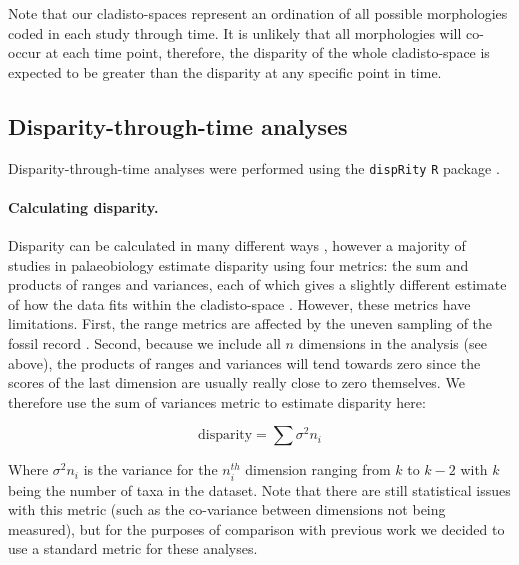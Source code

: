 \documentclass[12pt,a4paper]{article}
\begin{document}
Note that our cladisto-spaces represent an ordination of all possible morphologies coded in each study through time.
It is unlikely that all morphologies will co-occur at each time point, therefore, the disparity of the whole cladisto-space is expected to be greater than the disparity at any specific point in time.

\subsection{Disparity-through-time analyses}

Disparity-through-time analyses were performed using the \texttt{dispRity} \texttt{R} package \citep{dispRity.v02}. 

\paragraph{Calculating disparity.}
\label{disparity_calc}
Disparity can be calculated in many different ways \citep[e.g.][]{Wills1994,Ciampaglio2004,thorneresetting2011,hopkinsdecoupling2013,huang2015origins}, however a majority of studies in palaeobiology estimate disparity using four metrics: the sum and products of ranges and variances, each of which gives a slightly different estimate of how the data fits within the cladisto-space \citep{Foote01071994,Wills1994,brusatte50,Brusatte12092008,cisneros2010,thorneresetting2011,prentice2011,brusattedinosaur2012,toljagictriassic-jurassic2013,ruta2013,bentonmodels2014,bensonfaunal2014}.
However, these metrics have limitations. 
First, the range metrics are affected by the uneven sampling of the fossil record \citep{Butler2012}.
Second, because we include all $n$ dimensions in the analysis (see above), the products of ranges and variances will tend towards zero since the scores of the last dimension are usually really close to zero themselves. 
We therefore use the sum of variances metric to estimate disparity here:

\begin{equation}
\text{disparity} = \sum\sigma^{2}{n_i}
\end{equation}

Where $\sigma^{2}{n_i}$ is the variance for the $n_i^{th}$ dimension ranging from $k$ to $k-2$ with $k$ being the number of taxa in the dataset.
Note that there are still statistical issues with this metric (such as the co-variance between dimensions not being measured), but for the purposes of comparison with previous work we decided to use a standard metric for these analyses.
\end{document}
